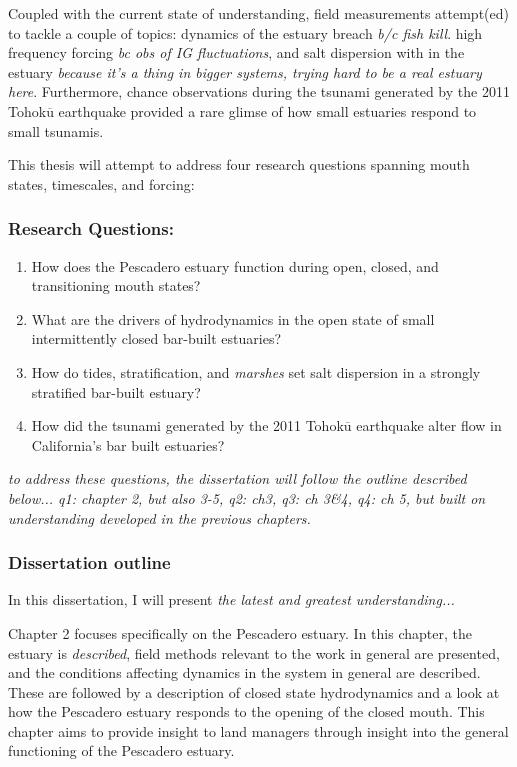 Coupled with the current state of understanding, field measurements attempt(ed) to tackle a couple of topics: dynamics of the estuary breach \emph{b/c fish kill}. high frequency forcing \emph{bc obs of IG fluctuations}, and salt dispersion with in the estuary \emph{because it's a thing in bigger systems, trying hard to be a real estuary here}. Furthermore, chance observations during the tsunami generated by the 2011 Tohok$\overline{\mathrm{u}}$ earthquake provided a rare glimse of how small estuaries respond to small tsunamis. 

This thesis will attempt to address four research questions spanning mouth states, timescales, and forcing: 


\subsubsection{Research Questions:}
\begin{enumerate}
	\item{How does the Pescadero estuary function during open, closed, and transitioning mouth states?}
	\item{What are the drivers of hydrodynamics in the open state of small intermittently closed bar-built estuaries?}
	\item{How do tides, stratification, and \emph{marshes} set salt dispersion in a strongly stratified bar-built estuary?}
	\item{How did the tsunami generated by the 2011 Tohok$\overline{\mathrm{u}}$ earthquake alter flow in California's bar built estuaries?}
\end{enumerate}

\emph{to address these questions, the dissertation will follow the outline described below... q1: chapter 2, but also 3-5, q2: ch3, q3: ch 3\&4, q4: ch 5, but built on understanding developed in the previous chapters.}


\subsubsection{Dissertation outline}

In this dissertation, I will present \emph{the latest and greatest understanding...}

Chapter 2 focuses specifically on the Pescadero estuary. In this chapter, the estuary is \emph{described}, field methods relevant to the work in general are presented, and the conditions affecting dynamics in the system in general are described. These are followed by a description of closed state hydrodynamics and a look at how the Pescadero estuary responds to the opening of the closed mouth. This chapter aims to provide insight to land managers through insight into the general functioning of the Pescadero estuary.

